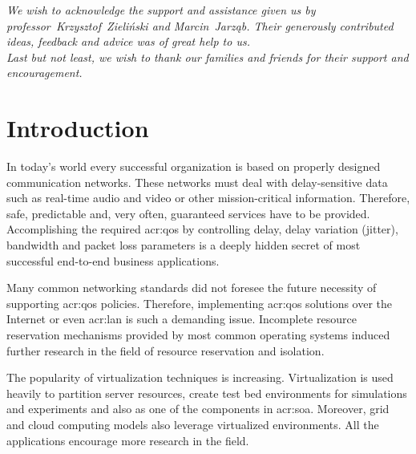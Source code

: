 \documentclass[11pt,openany]{book}
\newlength{\myheadrulewidth}
\renewcommand{\headrulewidth}{0pt}
\begin{document}
	\begin{center}
    \textit{We wish to acknowledge the support and assistance given us by professor~Krzysztof~Zieliński and
            Marcin~Jarząb. Their generously contributed ideas, feedback and advice was of great help to us. \\
            Last but not least, we wish to thank our families and friends for their support and encouragement.}
  \end{center}

	\vspace*{\fill}

  \tableofcontents

  \listoffigures

  \newpage

  \pagestyle{fancy}
  \lhead{\leftmark}
  \rhead{\thepage}
  \cfoot{}
  \renewcommand{\headrulewidth}{\myheadrulewidth}


  \chapter{Introduction}
  \label{chap:intro}


    In today's world every successful organization is based on properly designed communication networks. These networks
    must deal with delay-sensitive data such as real-time audio and video or other mission-critical information.
    Therefore, safe, predictable and, very often, guaranteed services have to be provided. Accomplishing the required
    \gls{acr:qos} by controlling delay, delay variation (jitter), bandwidth and packet loss parameters is a deeply
    hidden secret of most successful end-to-end business applications.
    
    Many common networking standards did not foresee the future necessity of supporting \gls{acr:qos} policies.
    Therefore, implementing \gls{acr:qos} solutions over the Internet or even \gls{acr:lan} is such a demanding issue.
    Incomplete resource reservation mechanisms provided by most common operating systems induced further research in the
    field of resource reservation and isolation. 

    The popularity of virtualization techniques is increasing. Virtualization is used heavily to partition server
    resources, create test bed environments for simulations and experiments and also as one of the components in
    \gls{acr:soa}. Moreover, grid and cloud computing models also leverage virtualized environments. All the
    applications encourage more research in the field.
\end{document}
